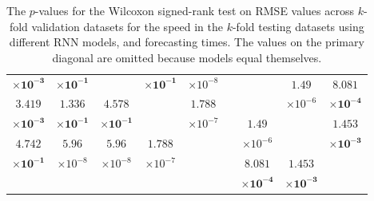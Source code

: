 \begin{table}[!ht]
{\begin{tabular}{|c|c|c|c|c|c|c|c|c|c|c|}
			$\mathbf{\times 10^{-3}}$ & $\mathbf{\times 10^{-1}}$ & & $\mathbf{\times 10^{-1}}$ & $\times 10^{-8}$ & \multicolumn{3}{c}{} & \multirow{2}{*}{} & $1.49$ & $\mathbf{8.081}$\\ \cline{1-5}
			$\mathbf{3.419}$ & $\mathbf{1.336}$ & $\mathbf{4.578}$ & \multirow{2}{*}{} & $1.788$ & \multicolumn{3}{c}{} & & $\times 10^{-6}$ & $\mathbf{\times 10^{-4}}$\\ \cline{9-11}
			$\mathbf{\times 10^{-3}}$ & $\mathbf{\times 10^{-1}}$ & $\mathbf{\times 10^{-1}}$ & & $\times 10^{-7}$ & \multicolumn{3}{c}{} & $1.49$ & \multirow{2}{*}{} & $\mathbf{1.453}$\\ \cline{1-5}
			$\mathbf{4.742}$ & $5.96$ & $5.96$ & $1.788$ & \multirow{2}{*}{} & \multicolumn{3}{c}{} & $\times 10^{-6}$ & & $\mathbf{\times 10^{-3}}$\\ \cline{9-11}
			$\mathbf{\times 10^{-1}}$ & $\times 10^{-8}$ & $\times 10^{-8}$ & $\times 10^{-7}$ & & \multicolumn{3}{c}{} & $\mathbf{8.081}$ & $\mathbf{1.453}$ & \multirow{2}{*}{} \\ \cline{1-5}
			 \multicolumn{8}{c}{} & $\mathbf{\times 10^{-4}}$ & $\mathbf{\times 10^{-3}}$ & \\ \cline{2-5} \cline{7-11}
		\end{tabular}
	}
	\caption{The $p$-values for the Wilcoxon signed-rank test on RMSE values across $k$-fold validation datasets for the speed in the $k$-fold testing datasets using different RNN models, and forecasting times. The values on the primary diagonal are omitted because models equal themselves.}
	\label{tab:var_speed_RMSE}
\end{table}